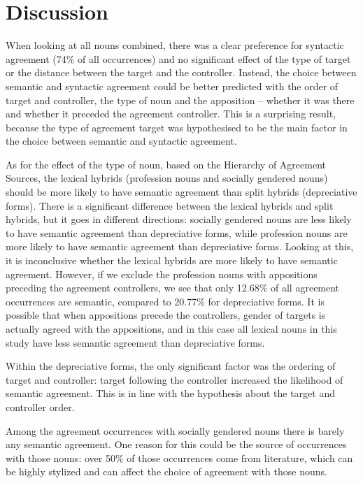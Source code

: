 \vspace{-.5cm}
\section{Discussion}
When looking at all nouns combined, there was a clear preference for syntactic agreement (74\% of all occurrences) and no significant effect of the type of target or the distance between the target and the controller. Instead, the choice between semantic and syntactic agreement could be better predicted with the order of target and controller, the type of noun and the apposition -- whether it was there and whether it preceded the agreement controller. This is a surprising result, because the type of agreement target was hypothesised to be the main factor in the choice between semantic and syntactic agreement. 

As for the effect of the type of noun, based on the Hierarchy of Agreement Sources, the lexical hybrids (profession nouns and socially gendered nouns) should be more likely to have semantic agreement than split hybrids (depreciative forms). There is a significant difference between the lexical hybrids and split hybrids, but it goes in different directions: socially gendered nouns are less likely to have semantic agreement than depreciative forms, while profession nouns are more likely to have semantic agreement than depreciative forms. Looking at this, it is inconclusive whether the lexical hybrids are more likely to have semantic agreement. However, if we exclude the profession nouns with appositions preceding the agreement controllers, we see that only 12.68\% of all agreement occurrences are semantic, compared to 20.77\% for depreciative forms. It is possible that when appositions precede the controllers, gender of targets is actually agreed with the appositions, and in this case all lexical nouns in this study have less semantic agreement than depreciative forms.

Within the depreciative forms, the only significant factor was the ordering of target and controller: target following the controller increased the likelihood of semantic agreement. This is in line with the hypothesis about the target and controller order.

Among the agreement occurrences with socially gendered nouns there is barely any semantic agreement. One reason for this could be the source of occurrences with those nouns: over 50\% of those occurrences come from literature, which can be highly stylized and can affect the choice of agreement with those nouns. 


